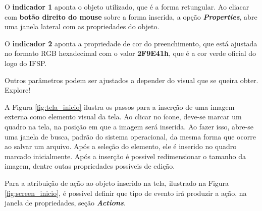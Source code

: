 O \textbf{indicador 1} aponta o objeto utilizado, 
que é a forma retungular.
Ao cliacar com \textbf{botão direito do mouse} sobre a forma inserida, 
a opção \textit{\textbf{Properties}}, 
abre uma janela lateral com as propriedades do objeto. 

O \textbf{indicador 2} 
aponta a propriedade de cor do preenchimento, 
que está ajustada no formato RGB hexadecimal com o valor \textbf{2F9E41h}, 
que é a cor verde oficial do logo do IFSP.

Outros parâmetros podem ser ajustados a depender do visual que se queira obter. Explore!


A Figura \ref{fig:tela_inicio} 
ilustra os passos para a inserção de uma imagem externa como elemento visual da tela. 
Ao clicar no ícone, deve-se marcar um quadro na tela, 
na posição em que a imagem será inserida.
Ao fazer isso, 
abre-se uma janela de busca, 
padrão do sistema operacional, 
da mesma forma que ocorre ao salvar um arquivo. 
Após a seleção do elemento, 
ele é inserido no quadro marcado inicialmente. 
Após a inserção é possivel redimensionar o tamanho da imagem, dentre outas propriedades possíveis de edição.

\begin{figure}[ht!]
	\centering
\end{figure}

Para a atribuição de ação ao objeto inserido na tela, 
ilustrado na Figura \ref{fig:screen_inicio},
é possivel definir que tipo de evento irá produzir a ação, 
na janela de propriedades, seção \textbf{\textit{Actions}}.



